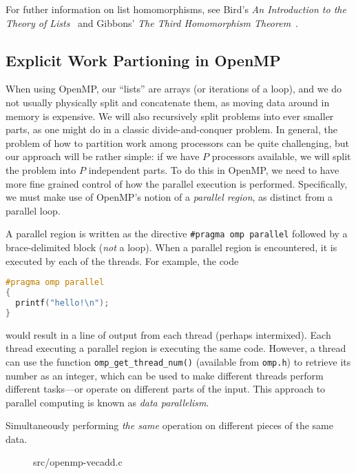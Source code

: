 For futher information on list homomorphisms, see Bird's \emph{An
  Introduction to the Theory of Lists}~\cite{theoryoflists} and
Gibbons' \emph{The Third Homomorphism
  Theorem}~\cite{gibbons1995third}.

\subsection{Explicit Work Partioning in OpenMP}

When using OpenMP, our ``lists'' are arrays (or iterations of a loop),
and we do not usually physically split and concatenate them, as moving
data around in memory is expensive. We will also recursively split
problems into ever smaller parts, as one might do in a classic
divide-and-conquer problem. In general, the problem of how to
partition work among processors can be quite challenging, but our
approach will be rather simple: if we have $P$ processors available,
we will split the problem into $P$ independent parts. To do this in
OpenMP, we need to have more fine grained control of how the parallel
execution is performed. Specifically, we must make use of OpenMP's
notion of a \emph{parallel region}, as distinct from a parallel loop.

A parallel region is written as the directive \texttt{\#pragma omp
  parallel} followed by a brace-delimited block (\emph{not} a loop).
When a parallel region is encountered, it is executed by each of the
threads. For example, the code
\begin{lstlisting}[language=C]
#pragma omp parallel
{
  printf("hello!\n");
}
\end{lstlisting}
would result in a line of output from each thread (perhaps
intermixed). Each thread executing a parallel region is executing the
same code. However, a thread can use the function
\texttt{omp\_get\_thread\_num()} (available from \texttt{omp.h}) to
retrieve its number as an integer, which can be used to make different
threads perform different tasks---or operate on different parts of the
input. This approach to parallel computing is known as \emph{data
  parallelism}.

\begin{definition}
  Simultaneously performing \textit{the same} operation on different
  pieces of the same data.
\end{definition}

\begin{figure}

{src/openmp-vecadd.c}
\end{figure}

